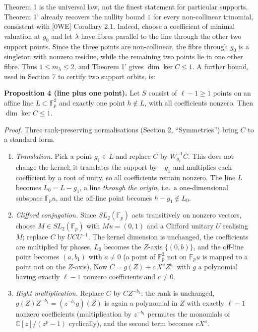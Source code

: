 \documentclass[
  11pt,
  a4paper,
]{article}
\begin{document}
Theorem 1 is the universal law, not the finest statement for particular
supports. Theorem 1' already recovers the nullity bound \(1\) for every
non-collinear trinomial, consistent with {[}0WE{]} Corollary 2.1.
Indeed, choose a coefficient of minimal valuation at \(g_0\) and let
\(\lambda\) have fibres parallel to the line through the other two
support points. Since the three points are non-collinear, the fibre
through \(g_0\) is a singleton with nonzero residue, while the remaining
two points lie in one other fibre. Thus \(1\le m_\lambda\le2\), and
Theorem 1' gives \(\dim\ker C\le1\). A further bound, used in Section 7
to certify two support orbits, is:

\textbf{Proposition 4 (line plus one point).} Let \(S\) consist of
\(\ell-1\ge1\) points on an affine line \(L\subset\mathbb F_p^2\) and
exactly one point \(h\notin L\), with all coefficients nonzero. Then
\(\dim\ker C\le1\).

\emph{Proof.} Three rank-preserving normalisations (Section 2,
``Symmetries'') bring \(C\) to a standard form.

\begin{enumerate}
\def\labelenumi{(\roman{enumi})}
\item
  \emph{Translation.} Pick a point \(g_1\in L\) and replace \(C\) by
  \(W_{g_1}^{-1}C\). This does not change the kernel; it translates the
  support by \(-g_1\) and multiplies each coefficient by a root of
  unity, so all coefficients remain nonzero. The line \(L\) becomes
  \(L_0=L-g_1\), a line \emph{through the origin}, i.e.~a
  one-dimensional subspace \(\mathbb F_pu\), and the off-line point
  becomes \(h-g_1\notin L_0\).
\item
  \emph{Clifford conjugation.} Since \(SL_2(\mathbb F_p)\) acts
  transitively on nonzero vectors, choose \(M\in SL_2(\mathbb F_p)\)
  with \(Mu=(0,\allowbreak{}1)\) and a Clifford unitary \(U\) realising \(M\);
  replace \(C\) by \(UCU^{-1}\). The kernel dimension is unchanged, the
  coefficients are multiplied by phases, \(L_0\) becomes the \(Z\)-axis
  \(\{(0,\allowbreak{}b)\}\), and the off-line point becomes \((a,\allowbreak{}b_1)\) with
  \(a\ne0\) (a point of \(\mathbb F_p^2\) not on \(\mathbb F_pu\) is
  mapped to a point not on the \(Z\)-axis). Now \(C=g(Z)+c\,\allowbreak{}X^aZ^{b_1}\)
  with \(g\) a polynomial having exactly \(\ell-1\) nonzero coefficients
  and \(c\ne0\).
\item
  \emph{Right multiplication.} Replace \(C\) by \(CZ^{-b_1}\): the rank
  is unchanged, \(g(Z)Z^{-b_1}=(z^{-b_1}g)(Z)\) is again a polynomial in
  \(Z\) with exactly \(\ell-1\) nonzero coefficients (multiplication by
  \(z^{-b_1}\) permutes the monomials of \(\mathbb C[z]/(z^p-1)\)
  cyclically), and the second term becomes \(cX^a\).
\end{enumerate}
\end{document}
